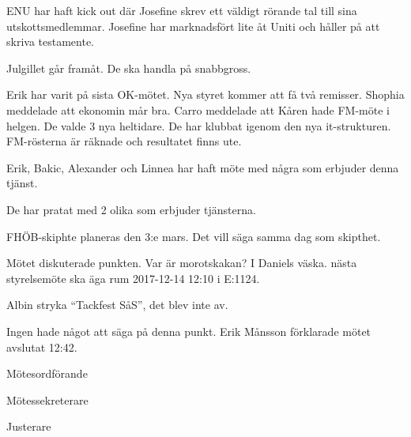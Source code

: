 \documentclass[10pt]{article}
\def\mo{Erik Månsson}
\def\ms{Johan Karlberg}
\def\ji{Josefine Sandström}
\begin{document}
\begin{paragrafer}
\begin{paragrafer}
ENU har haft kick out där Josefine skrev ett väldigt rörande tal till sina utskottsmedlemmar. Josefine har marknadsfört lite åt Uniti och håller på att skriva testamente.

Julgillet går framåt. De ska handla på snabbgross.

Erik har varit på sista OK-mötet. Nya styret kommer att få två remisser.
Shophia meddelade att ekonomin mår bra.
Carro meddelade att Kåren hade FM-möte i helgen. De valde 3 nya heltidare. De har klubbat igenom den nya it-strukturen. FM-rösterna är räknade och resultatet finns ute.
\end{paragrafer}

Erik, Bakic, Alexander och Linnea har haft möte med några som erbjuder denna tjänst.

De har pratat med 2 olika som erbjuder tjänsterna.

FHÖB-skiphte planeras den 3:e mars. Det vill säga samma dag som skipthet.

Mötet diskuterade punkten.
Var är morotskakan? I Daniels väska.
{\Mba} nästa styrelsemöte ska äga rum 2017-12-14 12:10 i E:1124.

Albin \ypa stryka ``Tackfest SåS'', det blev inte av.

\Mbaby
{}
Ingen hade något att säga på denna punkt.
{\mo} förklarade mötet avslutat 12:42.

\end{paragrafer}

\hidesignfoot
\begin{signatures}{3}
\signature{\mo}{Mötesordförande}
\signature{\ms}{Mötessekreterare}
\signature{\ji}{Justerare}
\end{signatures}
\end{document}
